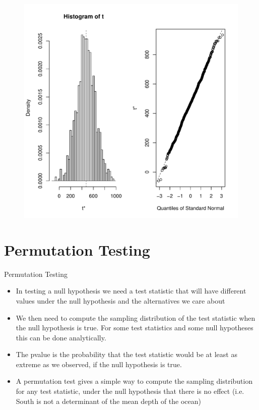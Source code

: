 \documentclass[10pt,handout]{beamer}\usepackage[]{graphicx}\usepackage[]{color}
\makeatletter
\def\maxwidth{ %
  \ifdim\Gin@nat@width>\linewidth
    \linewidth
  \else
    \Gin@nat@width
  \fi
}
\newenvironment{knitrout}{}{} %
\makeatother
\begin{document}
\begin{frame}
\begin{figure}
\begin{minipage}[h]{0.50\linewidth}
\begin{knitrout}
{\centering \includegraphics[width=\maxwidth]{figure/unnamed-chunk-13-1} 

}


\end{knitrout}
	\end{minipage}
\end{figure}
\end{frame}


\section{Permutation Testing}

\begin{frame}{Permutation Testing}
\begin{itemize}
	\item In testing a null hypothesis we need a test statistic that will have different values under the null hypothesis and the alternatives we	care about 
	\item We then need to compute the sampling distribution of the test	statistic when the null hypothesis is true. For some test statistics	and some null hypotheses this can be done analytically. 
	\item The pvalue is the probability that the test statistic would be at	least as extreme as we observed, if the null hypothesis is true.
	\item A permutation test gives a simple way to compute the sampling	distribution for any test statistic, under the null hypothesis that there is no effect (i.e. South is not a determinant of the mean depth of the ocean)
\end{itemize}
\end{frame}
\end{document}
